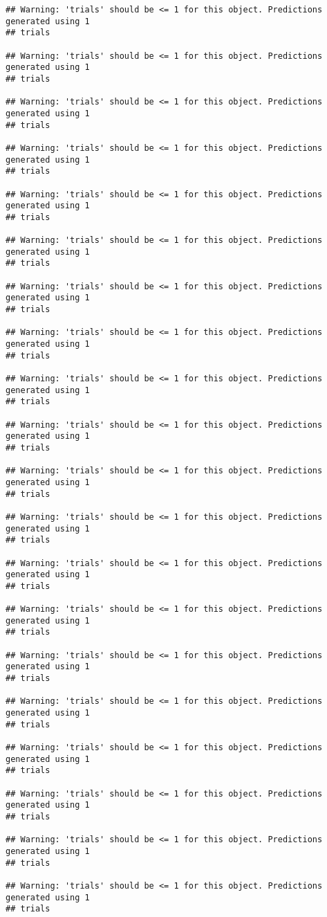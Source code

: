 \documentclass[
]{article}
\begin{document}
\begin{verbatim}
## Warning: 'trials' should be <= 1 for this object. Predictions generated using 1
## trials

## Warning: 'trials' should be <= 1 for this object. Predictions generated using 1
## trials

## Warning: 'trials' should be <= 1 for this object. Predictions generated using 1
## trials

## Warning: 'trials' should be <= 1 for this object. Predictions generated using 1
## trials

## Warning: 'trials' should be <= 1 for this object. Predictions generated using 1
## trials

## Warning: 'trials' should be <= 1 for this object. Predictions generated using 1
## trials

## Warning: 'trials' should be <= 1 for this object. Predictions generated using 1
## trials

## Warning: 'trials' should be <= 1 for this object. Predictions generated using 1
## trials

## Warning: 'trials' should be <= 1 for this object. Predictions generated using 1
## trials

## Warning: 'trials' should be <= 1 for this object. Predictions generated using 1
## trials

## Warning: 'trials' should be <= 1 for this object. Predictions generated using 1
## trials

## Warning: 'trials' should be <= 1 for this object. Predictions generated using 1
## trials

## Warning: 'trials' should be <= 1 for this object. Predictions generated using 1
## trials

## Warning: 'trials' should be <= 1 for this object. Predictions generated using 1
## trials

## Warning: 'trials' should be <= 1 for this object. Predictions generated using 1
## trials

## Warning: 'trials' should be <= 1 for this object. Predictions generated using 1
## trials

## Warning: 'trials' should be <= 1 for this object. Predictions generated using 1
## trials

## Warning: 'trials' should be <= 1 for this object. Predictions generated using 1
## trials

## Warning: 'trials' should be <= 1 for this object. Predictions generated using 1
## trials

## Warning: 'trials' should be <= 1 for this object. Predictions generated using 1
## trials
\end{verbatim}
\end{document}
